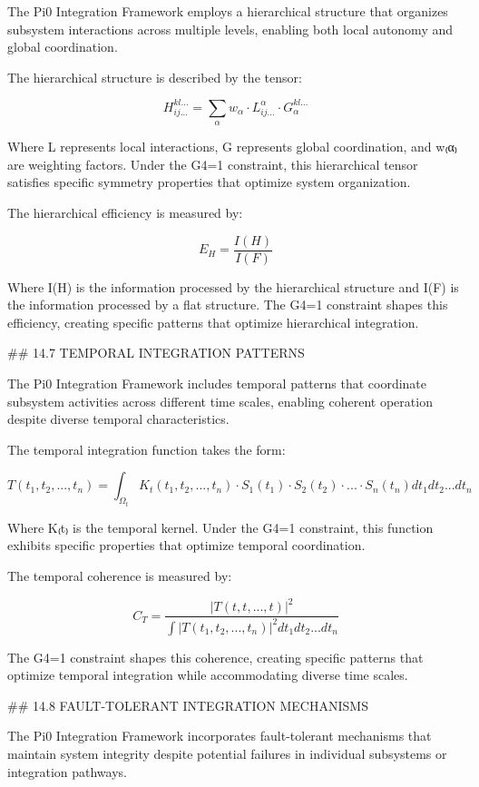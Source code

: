 The Pi0 Integration Framework employs a hierarchical structure that organizes subsystem interactions across multiple levels, enabling both local autonomy and global coordination.

The hierarchical structure is described by the tensor:

$$H_{ij...}^{kl...} = \sum_{\alpha} w_{\alpha} \cdot L_{ij...}^{\alpha} \cdot G_{\alpha}^{kl...}$$

Where L represents local interactions, G represents global coordination, and w₍α₎ are weighting factors. Under the G4=1 constraint, this hierarchical tensor satisfies specific symmetry properties that optimize system organization.

The hierarchical efficiency is measured by:

$$E_H = \frac{I(H)}{I(F)}$$

Where I(H) is the information processed by the hierarchical structure and I(F) is the information processed by a flat structure. The G4=1 constraint shapes this efficiency, creating specific patterns that optimize hierarchical integration.

## 14.7 TEMPORAL INTEGRATION PATTERNS

The Pi0 Integration Framework includes temporal patterns that coordinate subsystem activities across different time scales, enabling coherent operation despite diverse temporal characteristics.

The temporal integration function takes the form:

$$T(t_1, t_2, ..., t_n) = \int_{\Omega_t} K_t(t_1, t_2, ..., t_n) \cdot S_1(t_1) \cdot S_2(t_2) \cdot ... \cdot S_n(t_n) dt_1 dt_2 ... dt_n$$

Where K₍t₎ is the temporal kernel. Under the G4=1 constraint, this function exhibits specific properties that optimize temporal coordination.

The temporal coherence is measured by:

$$C_T = \frac{|T(t, t, ..., t)|^2}{\int |T(t_1, t_2, ..., t_n)|^2 dt_1 dt_2 ... dt_n}$$

The G4=1 constraint shapes this coherence, creating specific patterns that optimize temporal integration while accommodating diverse time scales.

## 14.8 FAULT-TOLERANT INTEGRATION MECHANISMS

The Pi0 Integration Framework incorporates fault-tolerant mechanisms that maintain system integrity despite potential failures in individual subsystems or integration pathways.

